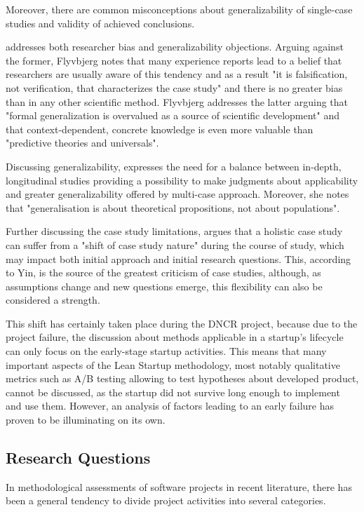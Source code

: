 \documentclass{article}
\begin{document}
Moreover, there are common misconceptions about generalizability of single-case studies and validity of achieved conclusions.

\cite{flyvbjerg2006five} addresses both researcher bias and generalizability objections. Arguing against the former, Flyvbjerg notes that many experience reports lead to a belief that researchers are usually aware of this tendency and as a result "it is falsification, not verification, that characterizes the case study" and there is no greater bias than in any other scientific method. Flyvbjerg addresses the latter arguing that "formal generalization is overvalued as a source of scientific development" and that context-dependent, concrete knowledge is even more valuable than "predictive theories and universals".

Discussing generalizability, \cite{meyer2001case} expresses the need for a balance between in-depth, longitudinal studies providing a possibility to make judgments about applicability and greater generalizability offered by multi-case approach. Moreover, she notes that "generalisation is about theoretical propositions, not about populations".

Further discussing the case study limitations, \cite{yin2013case} argues that a holistic case study can suffer from a "shift of case study nature" during the course of study, which may impact both initial approach and initial research questions. This, according to Yin, is the source of the greatest criticism of case studies, although, as assumptions change and new questions emerge, this flexibility can also be considered a strength.

This shift has certainly taken place during the DNCR project, because due to the project failure, the discussion about methods applicable in a startup's lifecycle can only focus on the early-stage startup activities. This means that many important aspects of the Lean Startup methodology, most notably qualitative metrics such as A/B testing allowing to test hypotheses about developed product, cannot be discussed, as the startup did not survive long enough to implement and use them. However, an analysis of factors leading to an early failure has proven to be illuminating on its own.

\subsection{Research Questions}
In methodological assessments of software projects in recent literature, there has been a general tendency to divide project activities into several categories.
\end{document}
